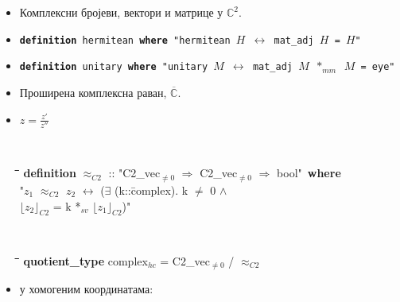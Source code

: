 \documentclass[slidestop, compress, mathserif, containsverbatim, xcolor=dvipsnames]{beamer}
\renewcommand{\C}[0]{\ensuremath{\mathbb{C}}}
\newcommand{\extC}[0]{\ensuremath{\overline{\C}}}
\newcommand{\Repnzv}[1]{\ensuremath{\lfloor#1\rfloor_{C2}}}
\newcommand{\approxhc}{\ensuremath{\approx_{C2}}}
\begin{document}
\begin{frame}{}
  \begin{itemize}
  \item Комплексни бројеви, вектори и матрице у $\mathbb{C}^2$. \vfill
  \item {} \begin{footnotesize} {\tt {\bf definition} hermitean {\bf where} "hermitean $H$ $\longleftrightarrow$ mat\_adj $H$ = $H$"\ } \end{footnotesize}  \vfill
  \item {} \begin{footnotesize} {\tt {\bf definition} unitary {\bf where} "unitary $M$ $\longleftrightarrow$ mat\_adj $M$ $*_{mm}$  $M$ = eye"\ } \end{footnotesize}  \vfill
  \item Проширена комплексна раван, $\extC$.  \vfill
  \item {} $z = \frac{z'}{z''}$
   \begin{footnotesize} {\tt
    \begin{tabbing}
      \hspace{5mm}\=\hspace{5mm}\=\hspace{5mm}\=\hspace{5mm}\=\hspace{5mm}\=\kill
      {\bf definition} $\approxhc$ :: "{}C2\_vec$_{\neq 0}$ $\Rightarrow$ C2\_vec$_{\neq 0}$ $\Rightarrow$ bool"\ {\bf where}\\
      \> "$z_1$ $\approxhc$ $z_2$ $\longleftrightarrow$ ($\exists$ (k::\=complex). k $\neq$ 0 $\wedge$ \\
      \>\> $\Repnzv{z_2}$ = k *$_{sv}$ $\Repnzv{z_1}$)"
    \end{tabbing}
  }
    {\tt
      \begin{tabbing}
        \hspace{5mm}\=\hspace{5mm}\=\hspace{5mm}\=\hspace{5mm}\=\hspace{5mm}\=\kill
        {\bf quotient\_type} complex$_{hc}$ = C2\_vec$_{\neq 0}$ / $\approxhc$
      \end{tabbing}
    } \end{footnotesize}  \vfill
  \item {} у хомогеним координатама: \begin{footnotesize} {\tt
}
\end{footnotesize}
\end{itemize}
\end{frame}
\end{document}
